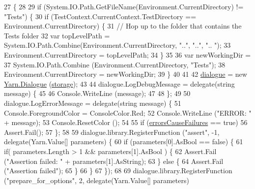 \begin{DoxyCode}
27         \{
28 
29             \textcolor{keywordflow}{if} (System.IO.Path.GetFileName(Environment.CurrentDirectory) != \textcolor{stringliteral}{"Tests"}) \{
30                 \textcolor{keywordflow}{if} (TestContext.CurrentContext.TestDirectory == Environment.CurrentDirectory) \{
31                     \textcolor{comment}{// Hop up to the folder that contains the Tests folder}
32                     var topLevelPath = System.IO.Path.Combine(Environment.CurrentDirectory, \textcolor{stringliteral}{".."}, \textcolor{stringliteral}{".."}, \textcolor{stringliteral}{"..
      "});
33                     Environment.CurrentDirectory = topLevelPath;
34                 \}
35 
36                 var newWorkingDir = 
37                     System.IO.Path.Combine (Environment.CurrentDirectory, \textcolor{stringliteral}{"Tests"});
38                 Environment.CurrentDirectory = newWorkingDir;
39             \}
40 
41 
42             \hyperlink{a00077_a71e2faf638964bef54b8e4beb440254a}{dialogue} = \textcolor{keyword}{new} \hyperlink{a00036}{Yarn.Dialogue} (\hyperlink{a00077_a79615582ff47da7c2603d52ca0aac07b}{storage});
43 
44             dialogue.LogDebugMessage = delegate(\textcolor{keywordtype}{string} message) \{
45                 
46                 Console.WriteLine (message);
47 
48             \};
49 
50             dialogue.LogErrorMessage = delegate(\textcolor{keywordtype}{string} message) \{
51                 Console.ForegroundColor = ConsoleColor.Red;
52                 Console.WriteLine (\textcolor{stringliteral}{"ERROR: "} + message);
53                 Console.ResetColor ();
54 
55                 \textcolor{keywordflow}{if} (\hyperlink{a00077_a1e0244f4c5261bad66a866fd6ec38f6d}{errorsCauseFailures} == \textcolor{keyword}{true})
56                     Assert.Fail();
57             \};
58 
59             dialogue.library.RegisterFunction (\textcolor{stringliteral}{"assert"}, -1, delegate(Yarn.Value[] parameters) \{
60                 \textcolor{keywordflow}{if} (parameters[0].AsBool == \textcolor{keyword}{false}) \{
61                     \textcolor{keywordflow}{if}( parameters.Length > 1 && parameters[1].AsBool ) \{
62                         Assert.Fail (\textcolor{stringliteral}{"Assertion failed: "} + parameters[1].AsString);
63                     \} \textcolor{keywordflow}{else} \{
64                         Assert.Fail (\textcolor{stringliteral}{"Assertion failed"});
65                     \}
66                 \}
67             \});
68 
69             dialogue.library.RegisterFunction (\textcolor{stringliteral}{"prepare\_for\_options"}, 2, delegate(Yarn.Value[] parameters) 

\end{DoxyCode}
